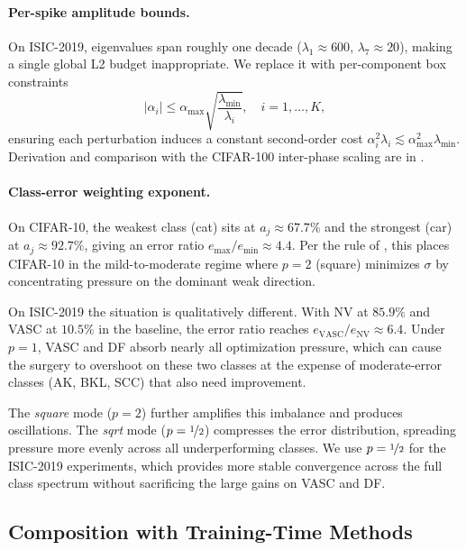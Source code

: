 \documentclass[11pt,a4paper]{article}
\begin{document}
\paragraph{Per-spike amplitude bounds.}
On ISIC-2019, eigenvalues span roughly one decade
($\lambda_1 \approx 600$, $\lambda_7 \approx 20$), making a single
global L2 budget inappropriate. We replace it with per-component box
constraints
\begin{equation}
  |\alpha_i| \leq \alpha_{\max} \sqrt{\frac{\lambda_{\min}}{\lambda_i}},
  \quad i = 1, \ldots, K,
  \label{eq:per-spike-budget}
\end{equation}
ensuring each perturbation induces a constant second-order cost
$\alpha_i^2 \lambda_i \lesssim \alpha_{\max}^2 \lambda_{\min}$.
Derivation and comparison with the CIFAR-100 inter-phase scaling are
in .

\paragraph{Class-error weighting exponent.}
On CIFAR-10, the weakest class (cat) sits at $a_j \approx 67.7\%$
and the strongest (car) at $a_j \approx 92.7\%$, giving an error
ratio $e_{\max}/e_{\min} \approx 4.4$. Per the rule of
, this places CIFAR-10 in the mild-to-moderate
regime where $p = 2$ (square) minimizes $\sigma$ by concentrating
pressure on the dominant weak direction.

On ISIC-2019 the situation is qualitatively different. With NV at
$85.9\%$ and VASC at $10.5\%$ in the baseline, the error ratio
reaches $e_{\mathrm{VASC}}/e_{\mathrm{NV}} \approx 6.4$. Under $p = 1$,
VASC and DF absorb nearly all optimization pressure, which can cause
the surgery to overshoot on these two classes at the expense of
moderate-error classes (AK, BKL, SCC) that also need improvement.

The \emph{square} mode ($p = 2$) further amplifies this imbalance and
produces oscillations. The \emph{sqrt} mode ($p = \nicefrac{1}{2}$)
compresses the error distribution, spreading pressure more evenly across
all underperforming classes. We use $p = \nicefrac{1}{2}$ for the
ISIC-2019 experiments, which provides more stable convergence across
the full class spectrum without sacrificing the large gains on VASC
and DF.

\subsection{Composition with Training-Time Methods}
\label{sec:isic-composition}
\end{document}

